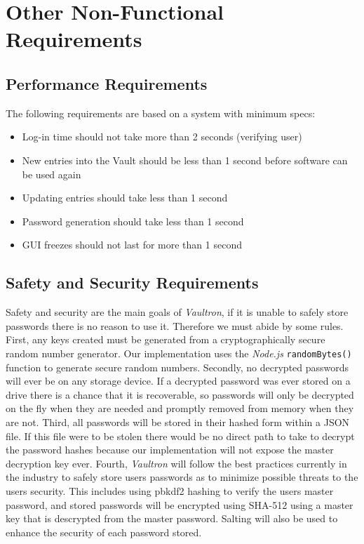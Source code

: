 \documentclass[11pt]{report}
\begin{document}


\chapter{Other Non-Functional Requirements}

\section{Performance Requirements}
The following requirements are based on a system with minimum specs:
\begin{itemize}
    \item Log-in time should not take more than 2 seconds (verifying user)
    \item New entries into the Vault should be less than 1 second before software can be used again
    \item Updating entries should take less than 1 second
    \item Password generation should take less than 1 second
    \item GUI freezes should not last for more than 1 second
\end{itemize}


\section{Safety and Security Requirements}
Safety and security are the main goals of \textit{Vaultron}, if it is
unable to safely store passwords there is no reason to use it. Therefore
we must abide by some rules. First, any keys created must be generated
from a cryptographically secure random number generator. Our implementation
uses the \textit{Node.js} \texttt{randomBytes()} function to generate
secure random numbers. Secondly, no decrypted passwords will ever be
on any storage device. If a decrypted password was ever stored on a drive
there is a chance that it is recoverable, so passwords will only be 
decrypted on the fly when they are needed and promptly removed from
memory when they are not. Third, all passwords will be stored in their
hashed form within a JSON file. If this file were to be stolen there
would be no direct path to take to decrypt the password hashes because
our implementation will not expose the master decryption key ever. 
Fourth, \textit{Vaultron} will follow the best practices currently in the
industry to safely store users passwords as to minimize possible threats
to the users security. This includes using pbkdf2 hashing to verify
the users master password, and stored passwords will be encrypted using
SHA-512 using a master key that is descrypted from the master password.
Salting will also be used to enhance the security of each password stored.
\end{document}
